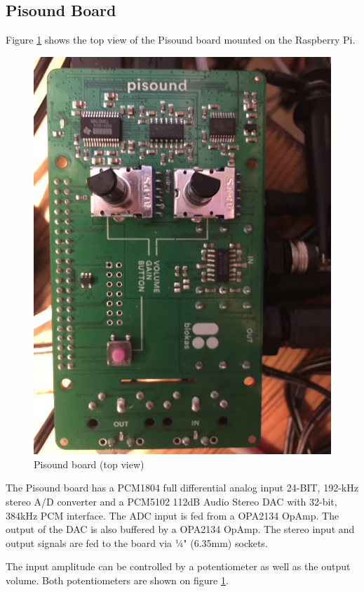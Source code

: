 \documentclass[11pt, oneside]{scrartcl}   	%
\begin{document}
\subsection{Pisound Board}
Figure \ref{fig:PisoundBoard} shows the top view of the Pisound board mounted on the Raspberry Pi.
\begin{figure}[tbph]
	\centering
	\includegraphics[width=0.9\linewidth]{Pisound.jpg}
	\caption[Pisound board]{Pisound board (top view)}
	\label{fig:PisoundBoard}
\end{figure}

The Pisound board has a PCM1804 full differential analog input 24-BIT, 192-kHz stereo A/D converter and 
a PCM5102 112dB Audio Stereo DAC with 32-bit, 384kHz PCM interface. The ADC input is fed from a OPA2134 OpAmp. 
The output of the DAC is also buffered by a OPA2134 OpAmp.
The stereo input and output signals are fed to the board via ¼" (6.35mm) sockets.

The input amplitude can be controlled by a potentiometer as well as the output volume. Both potentiometers are shown
on figure \ref{fig:PisoundBoard}.
\end{document}
